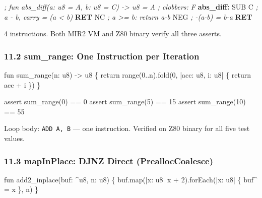 \documentclass[
  11pt,
]{article}
\newenvironment{Shaded}{\begin{snugshade}}{\end{snugshade}}
\newcommand{\BuiltInTok}[1]{#1}
\newcommand{\CommentTok}[1]{\textcolor[rgb]{0.56,0.35,0.01}{\textit{#1}}}
\newcommand{\ControlFlowTok}[1]{\textcolor[rgb]{0.13,0.29,0.53}{\textbf{#1}}}
\newcommand{\FunctionTok}[1]{\textcolor[rgb]{0.13,0.29,0.53}{\textbf{#1}}}
\newcommand{\NormalTok}[1]{#1}
\begin{document}
\begin{Shaded}
\begin{Highlighting}[]
\CommentTok{; fun abs\_diff(a: u8 = A, b: u8 = C) {-}\textgreater{} u8 = A ; clobbers: F}
\FunctionTok{abs\_diff:}
    \BuiltInTok{SUB}\NormalTok{ C       }\CommentTok{; a {-} b, carry = (a \textless{} b)}
    \ControlFlowTok{RET}\NormalTok{ NC      }\CommentTok{; a \textgreater{}= b: return a{-}b}
    \BuiltInTok{NEG}         \CommentTok{; {-}(a{-}b) = b{-}a}
    \ControlFlowTok{RET}
\end{Highlighting}
\end{Shaded}

4 instructions. Both MIR2 VM and Z80 binary verify all three asserts.

\hypertarget{sum_range-one-instruction-per-iteration}{%
\subsubsection{11.2 sum\_range: One Instruction per
Iteration}\label{sum_range-one-instruction-per-iteration}}

\begin{Shaded}
\begin{Highlighting}[]
\NormalTok{fun sum\_range(n: u8) {-}\textgreater{} u8 \{}
\NormalTok{    return range(0..n).fold(0, |acc: u8, i: u8| \{ return acc + i \})}
\NormalTok{\}}

\NormalTok{assert sum\_range(0)  == 0}
\NormalTok{assert sum\_range(5)  == 15}
\NormalTok{assert sum\_range(10) == 55}
\end{Highlighting}
\end{Shaded}

Loop body: \texttt{ADD\ A,\ B} --- one instruction. Verified on Z80
binary for all five test values.

\hypertarget{mapinplace-djnz-direct-prealloccoalesce}{%
\subsubsection{11.3 mapInPlace: DJNZ Direct
(PreallocCoalesce)}\label{mapinplace-djnz-direct-prealloccoalesce}}

\begin{Shaded}
\begin{Highlighting}[]
\NormalTok{fun add2\_inplace(buf: \^{}u8, n: u8) \{}
\NormalTok{    buf.map(|x: u8| x + 2).forEach(|x: u8| \{ buf\^{} = x \}, n)}
\NormalTok{\}}
\end{Highlighting}
\end{Shaded}
\end{document}
